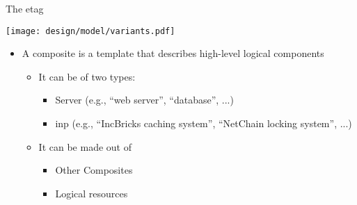 \begin{frame}{The \Gls*{etag}}

    \vspace{2mm}

    \centering
    \texttt{[image: design/model/variants.pdf]}

    \vspace{2mm}

    \begin{itemize}
        \item A composite is a template that describes high-level logical components
        \begin{itemize}
            \item It can be of two types:
            \begin{itemize}
                \item Server (e.g., “web server”, “database”, ...)
                \item \gls*{inp} (e.g., “IncBricks caching system”, “NetChain locking system”, ...)
            \end{itemize}
            \item It can be made out of
            \begin{itemize}
                \item Other Composites
                \item Logical resources
            \end{itemize}
        \end{itemize}
    \end{itemize}

    
\end{frame}

